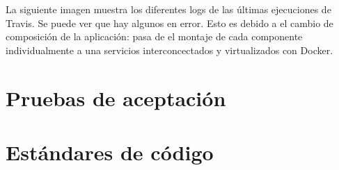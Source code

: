 La siguiente imagen muestra los diferentes logs de las últimas ejecuciones de Travis. Se puede ver que hay algunos en error. Esto es debido a el cambio de composición de la aplicación: pasa de el montaje de cada componente individualmente a una servicios interconcectados y virtualizados con Docker.



\section{Pruebas de aceptación}\label{sec:pruebas_aceptacion}

\section{Estándares de código}\label{sec:estandares_codigo}